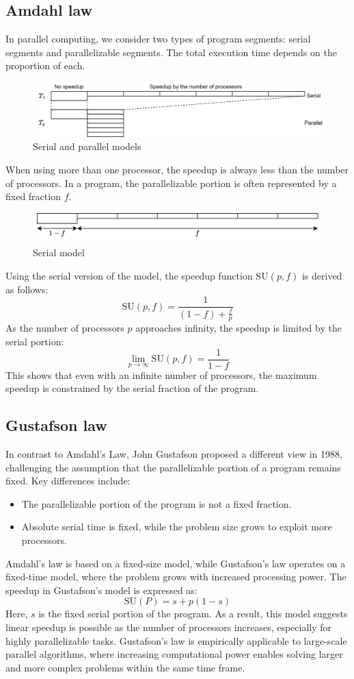 \subsection{Amdahl law}
In parallel computing, we consider two types of program segments: serial segments and parallelizable segments. 
The total execution time depends on the proportion of each.
\begin{figure}[H]
    \centering
    \includegraphics[width=0.8\linewidth]{images/am.png}
    \caption{Serial and parallel models}
\end{figure}
When using more than one processor, the speedup is always less than the number of processors. 
In a program, the parallelizable portion is often represented by a fixed fraction $f$. 
\begin{figure}[H]
    \centering
    \includegraphics[width=0.8\linewidth]{images/am1.png}
    \caption{Serial model}
\end{figure}
Using the serial version of the model, the speedup function $\text{SU}(p,f)$ is derived as follows:
\[\text{SU}(p,f)=\dfrac{1}{(1-f)+\frac{f}{p}}\]
As the number of processors $p$ approaches infinity, the speedup is limited by the serial portion:
\[\lim_{p\rightarrow\infty}\text{SU}(p,f)=\dfrac{1}{1-f}\]
This shows that even with an infinite number of processors, the maximum speedup is constrained by the serial fraction of the program. 

\subsection{Gustafson law}
In contrast to Amdahl's Law, John Gustafson proposed a different view in 1988, challenging the assumption that the parallelizable portion of a program remains fixed. 
Key differences include:
\begin{itemize}
    \item The parallelizable portion of the program is not a fixed fraction.
    \item Absolute serial time is fixed, while the problem size grows to exploit more processors.
\end{itemize}
Amdahl's law is based on a fixed-size model, while Gustafson's law operates on a fixed-time model, where the problem grows with increased processing power.
The speedup in Gustafson's model is expressed as:
\[\text{SU}(P)=s+p(1-s)\]
Here, $s$ is the fixed serial portion of the program.
As a result, this model suggests linear speedup is possible as the number of processors increases, especially for highly parallelizable tasks. 
Gustafson's law is empirically applicable to large-scale parallel algorithms, where increasing computational power enables solving larger and more complex problems within the same time frame.